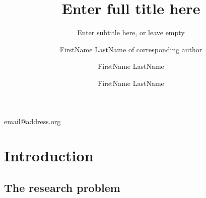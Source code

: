 \documentclass[american]{emisa}
\begin{document}
\begin{article}{%
  \title[Insert shorttitle for page headline]{Enter full title here}
  \subtitle{Enter subtitle here, or leave empty}
  \author*{FirstName LastName of corresponding author}{email@address.org}
  \address{Enter affiliation of first (corresponding) author here.  Note that only the starred version of author* accepts a second argument requiring an email address for the corresponding author.}
  \author{FirstName LastName}
  \address{Enter affiliation of second and further authors here. Add further authors following this scheme.}
  \author{FirstName LastName}
  \address[Letter of already used address]{}
  
  }
\section{Introduction}
\subsection{The research problem}
\printbibliography
\end{article}
\end{document}

